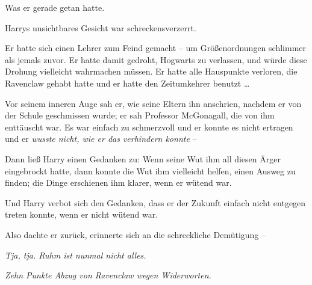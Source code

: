 Was er gerade getan hatte.

Harrys unsichtbares Gesicht war schreckensverzerrt.

Er hatte sich einen Lehrer zum Feind gemacht – um Größenordnungen schlimmer als jemals zuvor. Er hatte damit gedroht, Hogwarts zu verlassen, und würde diese Drohung vielleicht wahrmachen müssen. Er hatte alle Hauspunkte verloren, die Ravenclaw gehabt hatte und er hatte den Zeitumkehrer benutzt …

Vor seinem inneren Auge sah er, wie seine Eltern ihn anschrien, nachdem er von der Schule geschmissen wurde; er sah Professor McGonagall, die von ihm enttäuscht war. Es war einfach zu schmerzvoll und er konnte es nicht ertragen und er \emph{wusste nicht, wie er das verhindern konnte} –

Dann ließ Harry einen Gedanken zu: Wenn seine Wut ihm all diesen Ärger eingebrockt hatte, dann konnte die Wut ihm vielleicht helfen, einen Ausweg zu finden; die Dinge erschienen ihm klarer, wenn er wütend war.

Und Harry verbot sich den Gedanken, dass er der Zukunft einfach nicht entgegen treten konnte, wenn er nicht wütend war.

Also dachte er zurück, erinnerte sich an die schreckliche Demütigung –

\emph{Tja, tja. Ruhm ist nunmal nicht alles.}

\emph{Zehn Punkte Abzug von Ravenclaw wegen Widerworten.}

